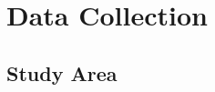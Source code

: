 \section{Data Collection}\label{ch:NDD,sec:dataCollection}


\subsection{Study Area}\label{ch:NDD,sec:dataCollection,sub:studyArea}



